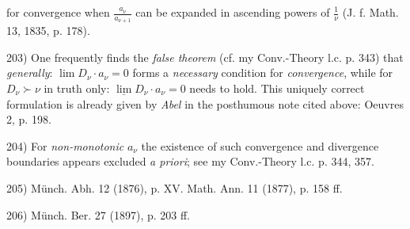 \vfill
\leftline{\rule{2in}{0.4pt}}
\vspace{0.2cm}
{
\footnotesize
for convergence when $\frac{a_\nu}{a_{\nu+1}}$ can be expanded in ascending powers of $\frac{1}{\nu}$ (J. f. Math. 13, 1835, p. 178).

203) One frequently finds the \textit{false theorem} (cf. my Conv.-Theory l.c. p. 343) that \textit{generally}: $\lim D_\nu \cdot a_\nu = 0$ forms a \textit{necessary} condition for \textit{convergence}, while for $D_\nu \succ \nu$ in truth only: $\underline{\lim} D_\nu \cdot a_\nu = 0$ needs to hold. This uniquely correct formulation is already given by \textit{Abel} in the posthumous note cited above: Oeuvres 2, p. 198.

204) For \textit{non-monotonic} $a_\nu$ the existence of such convergence and divergence boundaries appears excluded \textit{a priori}; see my Conv.-Theory l.c. p. 344, 357.

205) Münch. Abh. 12 (1876), p. XV. Math. Ann. 11 (1877), p. 158 ff.

206) Münch. Ber. 27 (1897), p. 203 ff.

}